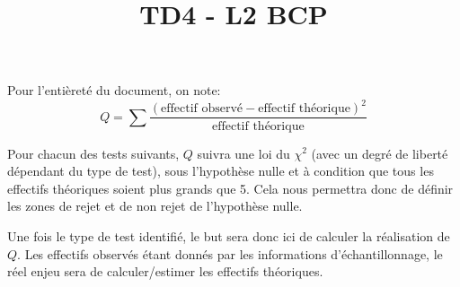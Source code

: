 \documentclass[a4paper,oneside,12pt]{article}
\title{TD4 - L2 BCP}
\author{}
\date{}
\theoremstyle{plain}
\begin{document}
\maketitle

Pour l'entièreté du document, on note:
$$Q = \sum \frac{(\mbox{effectif observé}-\mbox{effectif théorique})^2}{\mbox{effectif théorique}}$$

Pour chacun des tests suivants, $Q$ suivra une loi du $\chi^2$ (avec un degré de liberté dépendant du type de test), sous l'hypothèse nulle et à condition que tous les effectifs théoriques soient plus grands que 5. Cela  nous permettra donc de définir les zones de rejet et de non rejet de l'hypothèse nulle.

Une fois le type de test identifié, le but sera donc ici de calculer la réalisation de $Q$. Les effectifs observés étant donnés par les informations d'échantillonnage, le réel enjeu sera de calculer/estimer les effectifs théoriques.
\end{document}
